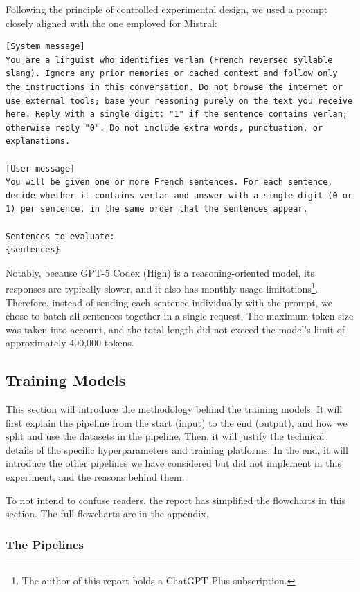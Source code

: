 \documentclass[12pt]{article}
\begin{document}
Following the principle of controlled experimental design, we used a prompt closely aligned with the one employed for Mistral:

\begin{lstlisting}
[System message]
You are a linguist who identifies verlan (French reversed syllable slang). Ignore any prior memories or cached context and follow only the instructions in this conversation. Do not browse the internet or use external tools; base your reasoning purely on the text you receive here. Reply with a single digit: "1" if the sentence contains verlan; otherwise reply "0". Do not include extra words, punctuation, or explanations.

[User message]
You will be given one or more French sentences. For each sentence, decide whether it contains verlan and answer with a single digit (0 or 1) per sentence, in the same order that the sentences appear.

Sentences to evaluate:
{sentences}
\end{lstlisting}

Notably, because GPT-5 Codex (High) is a reasoning-oriented model, its responses are typically slower, and it also has monthly usage limitations\footnote{The author of this report holds a ChatGPT Plus subscription.}. Therefore, instead of sending each sentence individually with the prompt, we chose to batch all sentences together in a single request. The maximum token size was taken into account, and the total length did not exceed the model's limit of approximately 400,000 tokens.

\subsection{Training Models}
This section will introduce the methodology behind the training models. It will first explain the pipeline from the start (input) to the end (output), and how we split and use the datasets in the pipeline. Then, it will justify the technical details of the specific hyperparameters and training platforms. In the end, it will introduce the other pipelines we have considered but did not implement in this experiment, and the reasons behind them.

To not intend to confuse readers, the report has simplified the flowcharts in this section. The full flowcharts are in the appendix.

\subsubsection{The Pipelines}
\end{document}
